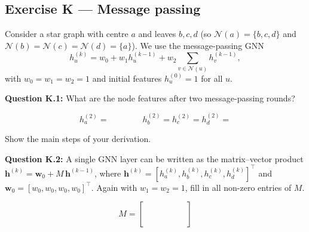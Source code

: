 \documentclass[12pt,a4paper]{article}
\begin{document}
\subsection*{Exercise K --- Message passing}

Consider a star graph with centre $a$ and leaves $b,c,d$ (so $\mathcal{N}(a)=\{b,c,d\}$ and
$\mathcal{N}(b)=\mathcal{N}(c)=\mathcal{N}(d)=\{a\}$).  We use the message-passing GNN
\[
  h_u^{(k)} = w_0 + w_1 h_u^{(k-1)} + w_2 \sum_{v\in\mathcal{N}(u)} h_v^{(k-1)}, \tag{15}
\]
with $w_0=w_1=w_2=1$ and initial features $h_u^{(0)}=1$ for all $u$.

\textbf{Question K.1:} What are the node features after two message-passing rounds?

\[
  h_a^{(2)} = \qquad\qquad h_b^{(2)} = h_c^{(2)} = h_d^{(2)} =
\]

Show the main steps of your derivation.

\vspace{3cm}

\textbf{Question K.2:} A single GNN layer can be written as the matrix--vector product
$\mathbf{h}^{(k)} = \mathbf{w}_0 + M\,\mathbf{h}^{(k-1)}$, where
$\mathbf{h}^{(k)}=[h_a^{(k)},h_b^{(k)},h_c^{(k)},h_d^{(k)}]^\top$ and
$\mathbf{w}_0=[w_0,w_0,w_0,w_0]^\top$.
Again with $w_1=w_2=1$, fill in all non-zero entries of $M$.

\[
  M = \begin{bmatrix} \phantom{1} & \phantom{1} & \phantom{1} & \phantom{1} \\[6pt]
                      & & & \\[6pt]
                      & & & \\[6pt]
                      & & & \end{bmatrix}
\]
\end{document}
